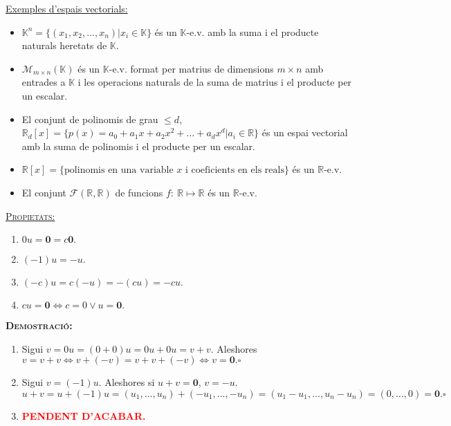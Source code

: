 \documentclass[11pt]{article}
\newcommand{\fieldk}{\mathbb{K}}
\newcommand{\demostracio}{\textbf{{\scshape Demostració:}}\\}
\begin{document}
\underline{Exemples d'espais vectorials:}
\begin{itemize}
	\item $\mathbb{K}^n=\{(x_1,x_2,\ldots,x_n)|x_i\in\mathbb{K}\}$ és un $\mathbb{K}$-e.v. amb la suma i el producte naturals heretats de $\mathbb{K}$.
	\item $\mathcal{M}_{m\times n}(\mathbb{K})$ és un $\fieldk$-e.v. format per matrius de dimensions $m\times n$ amb entrades a $\fieldk$ i les operacions naturals de la suma de matrius i el producte per un escalar.
	\item El conjunt de polinomis de grau $\leq d$, $\mathbb{R}_d[x]=\{p(x)=a_0+a_1x+a_2x^2+\ldots+a_dx^d|a_i\in\mathbb{R}\}$ és un espai vectorial amb la suma de polinomis i el producte per un escalar.
	\item $\mathbb{R}[x]=\{\textrm{polinomis en una variable }x\textrm{ i coeficients en els reals}\}$ és un $\mathbb{R}$-e.v.
	\item El conjunt $\mathcal{F}(\mathbb{R},\mathbb{R})$ de funcions $f: \ \mathbb{R}\mapsto\mathbb{R}$ és un $\mathbb{R}$-e.v.
\end{itemize}
\underline{{\scshape Propietats:}}
\begin{enumerate}
	\item $0u=\textbf{0}=c\textbf{0}.$
	\item $(-1)u=-u.$
	\item $(-c)u=c(-u)=-(cu)=-cu.$
	\item $cu=\textbf{0}\iff c=0\vee u=\textbf{0}.$
\end{enumerate}
\demostracio
\begin{enumerate}
	\item Sigui $v=0u=(0+0)u=0u+0u=v+v$. Aleshores $v=v+v\iff v+(-v)=v+v+(-v)\iff v=\textbf{0}.\square$
	\item Sigui $v=(-1)u$. Aleshores si $u+v=\textbf{0}$, $v=-u$.
	$$u+v=u+(-1)u=(u_1,\ldots,u_n)+(-u_1,\ldots,-u_n)=(u_1-u_1,\ldots,u_n-u_n)=(0,\ldots,0)=\textbf{0}.\square$$
	\item \textcolor{red}{\textbf{PENDENT D'ACABAR.}}
\end{enumerate}

\newpage
\end{document}
